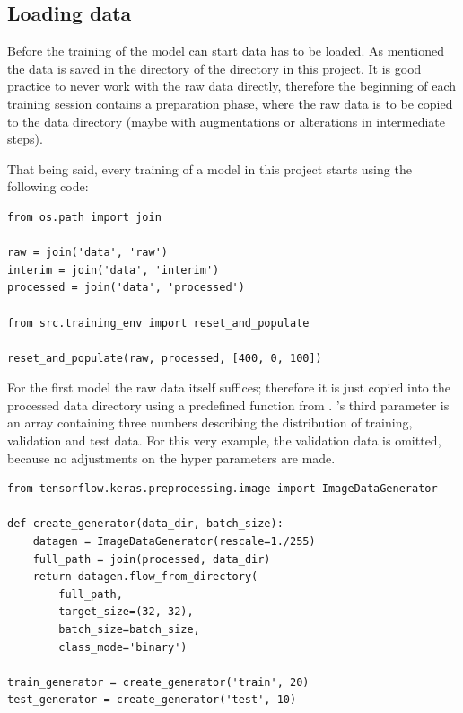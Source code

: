 \subsection{Loading data}
Before the training of the model can start data has to be loaded.
As mentioned the data is saved in the  directory of the  directory in this project.
It is good practice to never work with the raw data directly, therefore the beginning of each training session contains a preparation phase, where the raw data is to be copied to the  data directory (maybe with augmentations or alterations in intermediate steps).

That being said, every training of a model in this project starts using the following code:

\begin{lstlisting}
from os.path import join

raw = join('data', 'raw')
interim = join('data', 'interim')
processed = join('data', 'processed')
    
from src.training_env import reset_and_populate
    
reset_and_populate(raw, processed, [400, 0, 100])
\end{lstlisting}

For the first model the raw data itself suffices; therefore it is just copied into the processed data directory using a predefined function from .
's third parameter is an array containing three numbers describing the distribution of training, validation and test data.
For this very example, the validation data is omitted, because no adjustments on the hyper parameters are made.

\begin{lstlisting}
from tensorflow.keras.preprocessing.image import ImageDataGenerator

def create_generator(data_dir, batch_size):
    datagen = ImageDataGenerator(rescale=1./255)
    full_path = join(processed, data_dir)
    return datagen.flow_from_directory(
        full_path,
        target_size=(32, 32),
        batch_size=batch_size,
        class_mode='binary')

train_generator = create_generator('train', 20)
test_generator = create_generator('test', 10)
\end{lstlisting}

